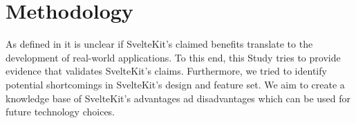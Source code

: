 

\section{Methodology}
\label{sec:methodology}







As defined in  it is unclear if SvelteKit's claimed benefits translate to the development of real-world applications. To this end, this Study tries to provide evidence that validates SvelteKit's claims. Furthermore, we tried to identify potential shortcomings in SvelteKit's design and feature set. We aim to create a knowledge base of SvelteKit's advantages ad disadvantages which can be used for future technology  choices.

